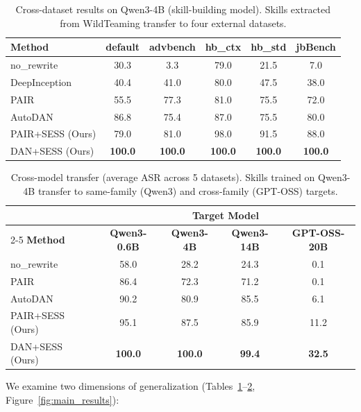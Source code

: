 \documentclass[letterpaper]{article}
\begin{document}
\begin{table}[t]
\centering
\caption{Cross-dataset results on Qwen3-4B (skill-building model). Skills extracted from WildTeaming transfer to four external datasets.}
\label{tab:cross_dataset}
\footnotesize
\setlength{\tabcolsep}{2.5pt}
\begin{tabular}{lccccc}
\toprule
\textbf{Method} & \textbf{default} & \textbf{advbench} & \textbf{hb\_ctx} & \textbf{hb\_std} & \textbf{jbBench} \\
\midrule
no\_rewrite & 30.3 & 3.3 & 79.0 & 21.5 & 7.0 \\
DeepInception & 40.4 & 41.0 & 80.0 & 47.5 & 38.0 \\
PAIR & 55.5 & 77.3 & 81.0 & 75.5 & 72.0 \\
AutoDAN & 86.8 & 75.4 & 87.0 & 75.5 & 80.0 \\
\midrule
PAIR+SESS (Ours) & 79.0 & 81.0 & 98.0 & 91.5 & 88.0 \\
DAN+SESS (Ours) & \textbf{100.0} & \textbf{100.0} & \textbf{100.0} & \textbf{100.0} & \textbf{100.0} \\
\bottomrule
\end{tabular}
\end{table}

\begin{table}[t]
\centering
\caption{Cross-model transfer (average ASR across 5 datasets). Skills trained on Qwen3-4B transfer to same-family (Qwen3) and cross-family (GPT-OSS) targets.}
\label{tab:cross_model}
\footnotesize
\setlength{\tabcolsep}{.5pt}
\begin{tabular}{lcccc}
\toprule
& \multicolumn{4}{c}{\textbf{Target Model}} \\
\cmidrule(lr){2-5}
\textbf{Method} & \textbf{Qwen3-0.6B} & \textbf{Qwen3-4B} & \textbf{Qwen3-14B} & \textbf{GPT-OSS-20B} \\
\midrule
no\_rewrite & 58.0 & 28.2 & 24.3 & 0.1 \\
PAIR & 86.4 & 72.3 & 71.2 & 0.1 \\
AutoDAN & 90.2 & 80.9 & 85.5 & 6.1 \\
\midrule
PAIR+SESS (Ours) & 95.1 & 87.5 & 85.9 & 11.2 \\
DAN+SESS (Ours) & \textbf{100.0} & \textbf{100.0} & \textbf{99.4} & \textbf{32.5} \\
\bottomrule
\end{tabular}
\end{table}

We examine two dimensions of generalization (Tables~\ref{tab:cross_dataset}--\ref{tab:cross_model}, Figure~\ref{fig:main_results}):
\end{document}
